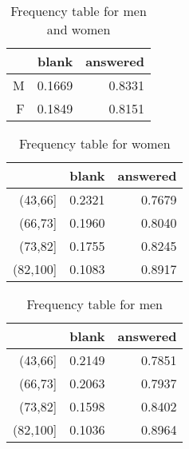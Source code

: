 \documentclass{article}\usepackage{graphicx, color}
\begin{document}
\begin{table}[ht]
\centering
\begin{tabular}{rrr}
  \hline
 & blank & answered \\ 
  \hline
M & 0.1669 & 0.8331 \\ 
  F & 0.1849 & 0.8151 \\ 
   \hline
\end{tabular}
\caption{Frequency table for men and women} 
\end{table}
\begin{table}[ht]
\centering
\begin{tabular}{rrr}
  \hline
 & blank & answered \\ 
  \hline
(43,66] & 0.2321 & 0.7679 \\ 
  (66,73] & 0.1960 & 0.8040 \\ 
  (73,82] & 0.1755 & 0.8245 \\ 
  (82,100] & 0.1083 & 0.8917 \\ 
   \hline
\end{tabular}
\caption{Frequency table for women} 
\end{table}
\begin{table}[ht]
\centering
\begin{tabular}{rrr}
  \hline
 & blank & answered \\ 
  \hline
(43,66] & 0.2149 & 0.7851 \\ 
  (66,73] & 0.2063 & 0.7937 \\ 
  (73,82] & 0.1598 & 0.8402 \\ 
  (82,100] & 0.1036 & 0.8964 \\ 
   \hline
\end{tabular}
\caption{Frequency table for men} 
\end{table}
\end{document}
